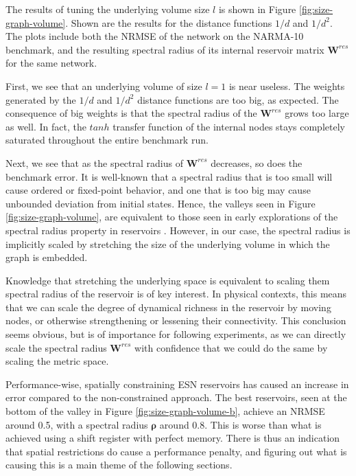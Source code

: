 The results of tuning the underlying volume size $l$ is shown in Figure
\ref{fig:size-graph-volume}. Shown are the results for the distance functions
$1/d$ and $1/d^2$. The plots include both the NRMSE of the network on the
NARMA-10 benchmark, and the resulting spectral radius of its internal reservoir
matrix $\mathbf{W}^{res}$ for the same network.

First, we see that an underlying volume of size $l = 1$ is near useless. The
weights generated by the $1/d$ and $1/d^2$ distance functions are too big, as
expected. The consequence of big weights is that the spectral radius of the
$\mathbf{W}^{res}$ grows too large as well. In fact, the $tanh$ transfer
function of the internal nodes stays completely saturated throughout the entire
benchmark run.

Next, we see that as the spectral radius of $\mathbf{W}^{res}$ decreases, so
does the benchmark error. It is well-known that a spectral radius that is too
small will cause ordered or fixed-point behavior, and one that is too big may
cause unbounded deviation from initial states. Hence, the valleys seen in Figure
\ref{fig:size-graph-volume}, are equivalent to those seen in early explorations
of the spectral radius property in reservoirs
\cite{verstraeten_experimental_2007}. However, in our case, the spectral radius
is implicitly scaled by stretching the size of the underlying volume in which
the graph is embedded.

Knowledge that stretching the underlying space is equivalent to scaling them
spectral radius of the reservoir is of key interest. In physical contexts, this
means that we can scale the degree of dynamical richness in the reservoir by
moving nodes, or otherwise strengthening or lessening their connectivity. This
conclusion seems obvious, but is of importance for following experiments, as we
can directly scale the spectral radius $\mathbf{W}^{res}$ with confidence that
we could do the same by scaling the metric space.

Performance-wise, spatially constraining ESN reservoirs has caused an increase
in error compared to the non-constrained approach. The best reservoirs, seen at
the bottom of the valley in Figure \ref{fig:size-graph-volume-b}, achieve an
NRMSE around 0.5, with a spectral radius $\boldsymbol{\rho}$ around 0.8. This is
worse than what is achieved using a shift register with perfect memory. There is
thus an indication that spatial restrictions do cause a performance penalty, and
figuring out what is causing this is a main theme of the following sections.


